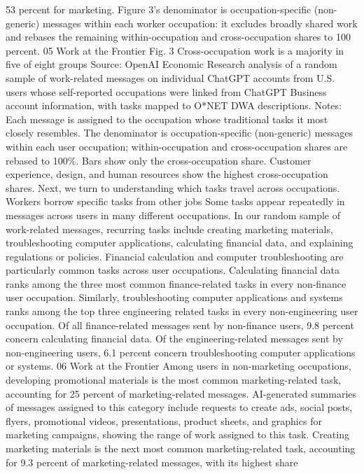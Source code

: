 53 percent for marketing. Figure 3’s denominator is occupation-specific (non-generic) messages within
each worker occupation: it excludes broadly shared work and rebases the remaining within-occupation
and cross-occupation shares to 100 percent.
05
Work at the Frontier
Fig. 3
Cross-occupation work is a majority in five of eight groups
Source: OpenAI Economic Research analysis of a random sample of work-related messages on individual ChatGPT accounts
from U.S. users whose self-reported occupations were linked from ChatGPT Business account information, with tasks mapped
to O*NET DWA descriptions. Notes: Each message is assigned to the occupation whose traditional tasks it most closely
resembles. The denominator is occupation-specific (non-generic) messages within each user occupation; within-occupation
and cross-occupation shares are rebased to 100\%. Bars show only the cross-occupation share.
Customer experience, design, and human resources show the highest cross-occupation shares. Next, we
turn to understanding which tasks travel across occupations.
Workers borrow specific tasks from
other jobs
Some tasks appear repeatedly in messages across users in many different occupations. In our random
sample of work-related messages, recurring tasks include creating marketing materials, troubleshooting
computer applications, calculating financial data, and explaining regulations or policies.
Financial calculation and computer troubleshooting are particularly common tasks across user
occupations. Calculating financial data ranks among the three most common finance-related tasks
in every non-finance user occupation. Similarly, troubleshooting computer applications and systems
ranks among the top three engineering related tasks in every non-engineering user occupation. Of all
finance-related messages sent by non-finance users, 9.8 percent concern calculating financial data. Of
the engineering-related messages sent by non-engineering users, 6.1 percent concern troubleshooting
computer applications or systems.
06
Work at the Frontier
Among users in non-marketing occupations, developing promotional materials is the most common
marketing-related task, accounting for 25 percent of marketing-related messages. AI-generated
summaries of messages assigned to this category include requests to create ads, social posts, flyers,
promotional videos, presentations, product sheets, and graphics for marketing campaigns, showing
the range of work assigned to this task. Creating marketing materials is the next most common
marketing-related task, accounting for 9.3 percent of marketing-related messages, with its highest share
